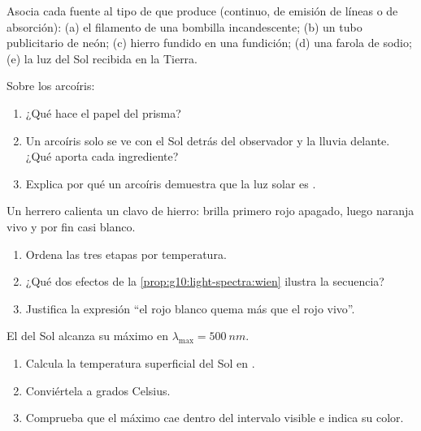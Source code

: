 \begin{exercise}[$\star$]\label{exo:g10:light-spectra:3}
Asocia cada fuente al tipo de  que produce (continuo, de
emisión de líneas o de absorción): (a) el filamento de una bombilla
incandescente; (b) un tubo publicitario de neón; (c) hierro fundido en
una fundición; (d) una farola de sodio; (e) la luz del Sol recibida en
la Tierra.
\end{exercise}

\begin{exercise}[$\star$]\label{exo:g10:light-spectra:4}
Sobre los arcoíris:
\begin{enumerate}
  \item ¿Qué hace el papel del prisma?
  \item Un arcoíris solo se ve con el Sol detrás del observador y la
        lluvia delante. ¿Qué aporta cada ingrediente?
  \item Explica por qué un arcoíris demuestra que la luz solar es .
\end{enumerate}
\end{exercise}

\begin{exercise}[$\star$]\label{exo:g10:light-spectra:5}
Un herrero calienta un clavo de hierro: brilla primero rojo apagado,
luego naranja vivo y por fin casi blanco.
\begin{enumerate}
  \item Ordena las tres etapas por temperatura.
  \item ¿Qué dos efectos de la \cref{prop:g10:light-spectra:wien}
        ilustra la secuencia?
  \item Justifica la expresión ``el rojo blanco quema más que el rojo
        vivo''.
\end{enumerate}
\end{exercise}

\begin{exercise}[$\star\star$]\label{exo:g10:light-spectra:6}
El  del Sol alcanza su máximo en
$\lambda_{\max} = \qty{500}{nm}$.
\begin{enumerate}
  \item Calcula la temperatura superficial del Sol en .
  \item Conviértela a grados Celsius.
  \item Comprueba que el máximo cae dentro del intervalo visible e
        indica su color.
\end{enumerate}
\end{exercise}

